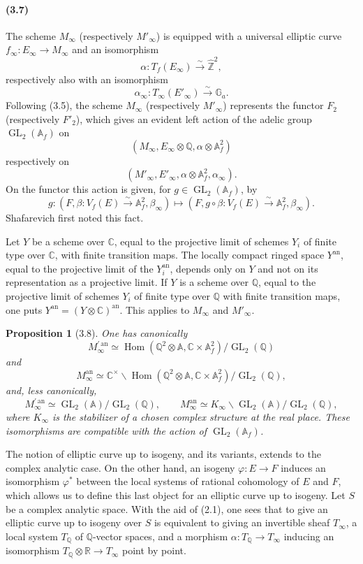 \documentclass[10pt]{article}
\newcommand{\A}{\mathbb A}
\newcommand{\Af}{\mathbb A_f}
\newcommand{\C}{\mathbb C}
\newcommand{\Q}{\mathbb Q}
\newcommand{\R}{\mathbb R}
\newcommand{\bZ}{\widehat{\mathbb Z}}
\newcommand{\Ga}{\mathbb G_a}
\newcommand{\GL}{\operatorname{GL}}
\newcommand{\Hom}{\operatorname{Hom}}
\newcommand{\an}{\mathrm{an}}
\newtheorem*{proposition}{Proposition}
\begin{document}
\paragraph{(3.7)}
The scheme $M_\infty$ (respectively $M'_\infty$) is equipped with a universal elliptic
curve $f_\infty:E_\infty\to M_\infty$ and an isomorphism
\[
\alpha:T_f(E_\infty)\xrightarrow{\sim}\bZ^2,
\]
respectively also with an isomorphism
\[
\alpha_\infty:T_\infty(E'_\infty)\xrightarrow{\sim}\Ga.
\]
Following (3.5), the scheme $M_\infty$ (respectively $M'_\infty$) represents the functor
$F_2$ (respectively $F'_2$), which gives an evident left action of the adelic group
$\GL_2(\Af)$ on
\[
(M_\infty,E_\infty\otimes\Q,\alpha\otimes\Af^2)
\]
respectively on
\[
(M'_\infty,E'_\infty,\alpha\otimes\Af^2,\alpha_\infty).
\]
On the functor this action is given, for $g\in\GL_2(\Af)$, by
\[
g:(F,\beta:V_f(E)\xrightarrow{\sim}\Af^2,\beta_\infty)
\longmapsto
(F,g\circ\beta:V_f(E)\xrightarrow{\sim}\Af^2,\beta_\infty).
\]
Shafarevich first noted this fact.

Let $Y$ be a scheme over $\C$, equal to the projective limit of schemes $Y_i$ of finite
type over $\C$, with finite transition maps. The locally compact ringed space $Y^{\an}$,
equal to the projective limit of the $Y_i^{\an}$, depends only on $Y$ and not on its
representation as a projective limit. If $Y$ is a scheme over $\Q$, equal to the projective
limit of schemes $Y_i$ of finite type over $\Q$ with finite transition maps, one puts
$Y^{\an}=(Y\otimes\C)^{\an}$. This applies to $M_\infty$ and $M'_\infty$.

\begin{proposition}[3.8]
One has canonically
\[
M_\infty^{\prime\,\an}\simeq
\Hom(\Q^2\otimes\A,\C\times\Af^2)/\GL_2(\Q)
\]
and
\[
M_\infty^{\an}\simeq
\C^\times\backslash\Hom(\Q^2\otimes\A,\C\times\Af^2)/\GL_2(\Q),
\]
and, less canonically,
\[
M_\infty^{\prime\,\an}\simeq \GL_2(\A)/\GL_2(\Q),\qquad
M_\infty^{\an}\simeq K_\infty\backslash \GL_2(\A)/\GL_2(\Q),
\]
where $K_\infty$ is the stabilizer of a chosen complex structure at the real place. These
isomorphisms are compatible with the action of $\GL_2(\Af)$.
\end{proposition}

The notion of elliptic curve up to isogeny, and its variants, extends to the complex analytic
case. On the other hand, an isogeny $\varphi:E\to F$ induces an isomorphism $\varphi^*$
between the local systems of rational cohomology of $E$ and $F$, which allows us to define
this last object for an elliptic curve up to isogeny. Let $S$ be a complex analytic space.
With the aid of (2.1), one sees that to give an elliptic curve up to isogeny over $S$ is
equivalent to giving an invertible sheaf $T_\infty$, a local system $T_\Q$ of $\Q$-vector
spaces, and a morphism $\alpha:T_\Q\to T_\infty$ inducing an isomorphism
$T_\Q\otimes\R\to T_\infty$ point by point.
\end{document}
